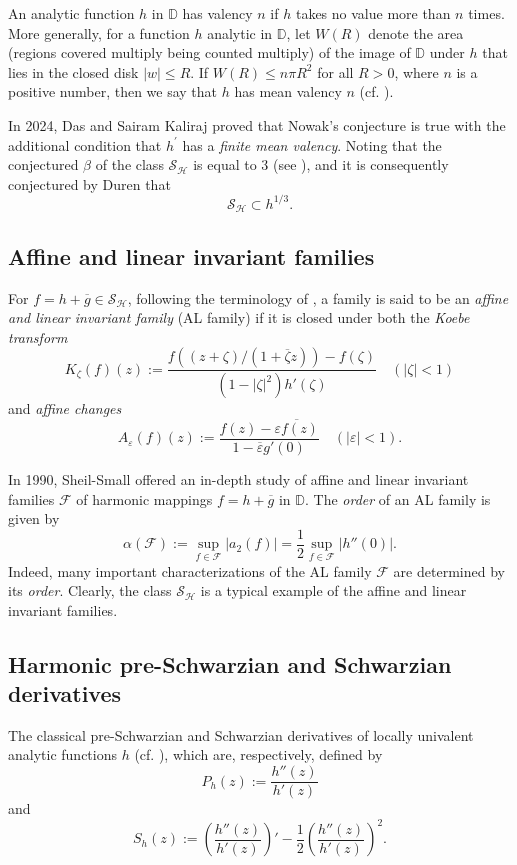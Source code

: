 \documentclass[11pt, reqno]{amsart}
\numberwithin{equation}{section}
\newcommand{\abs}[1]{\left\vert#1\right\vert}
\newcommand{\D}{\mbox{$\mathbb{D}$}}
\begin{document}
An analytic function $h$ in $\D$ has valency $n$ if $h$ takes no value
more than $n$ times. More generally, for a function $h$ analytic in $\D$, let $W(R)$ denote
the area (regions covered multiply being counted multiply) of the image of $\D$ under
$h$ that lies in the closed disk $\abs{w}\leq R$. If $W(R)\leq n\pi R^2$ for all $R>0$, where $n$ is a positive number, then we say that $h$ has mean valency $n$ (cf. \cite{ds}).


In 2024, Das and Sairam Kaliraj \cite[Theorem 1]{ds}
proved that Nowak's conjecture is true with the additional condition that $h^\prime$ has a \textit{finite mean valency}. %
Noting that the conjectured $\beta$ of the class $\mathcal{S}_\mathcal{H}$ is equal to $3$ (see \cite{cs}), and it is consequently conjectured by Duren \cite[p. 152, Sect. 8.5]{d} that $$\mathcal{S}_\mathcal{H}\subset h^{{1}/{3}}.$$%

\subsection{Affine and linear invariant families}
For $f=h+\overline{g}\in\mathcal{S}_\mathcal{H}$, following the terminology of \cite{s}, a family is said to be an \textit{affine
and linear invariant family} ({AL} family) if it is closed under both the \textit{Koebe transform}
$$
K_{\zeta}(f)(z):=\frac{f\left((z+\zeta)/\left(1+\overline{\zeta} z\right)\right)-f(\zeta)}{\left(1-\abs{\zeta}^2\right)h'(\zeta)}
\quad(\abs{\zeta}<1)
$$
and \textit{affine changes}
$$A_{\varepsilon}(f)(z):=\frac{f(z)-\overline{\varepsilon f(z)}}{1-\overline{\varepsilon}g'(0)}
\quad(\abs{\varepsilon}<1).$$

In 1990, Sheil-Small \cite{s} %
offered an in-depth study of affine and linear invariant families $\mathcal{F}$ of
harmonic mappings $f=h+\overline{g}$ in $\D$. The {\it order} of an AL family is given by
$$\alpha(\mathcal{F}):=\sup\limits_
{f\in\mathcal{F}}
\abs{a_2(f)}=\frac{1}{2}
\sup\limits_
{f\in\mathcal{F}}
\abs{h''(0)}.$$
Indeed, many important characterizations of the AL family $\mathcal{F}$ are determined
by its {\it order}. Clearly, the class $\mathcal{S_{\mathcal{H}}}$ is a typical example of the affine and linear invariant families.

\subsection{Harmonic pre-Schwarzian and Schwarzian derivatives}
The classical pre-Schwarzian and Schwarzian derivatives of locally univalent analytic functions $h$ (cf. \cite{du}),
which are, respectively, defined by
$$P_h(z):=\frac{h''(z)}{h'(z)}$$
and
$$S_h(z):=\left(\frac{h''(z)}{h'(z)}\right)'-\frac{1}{2}\left(\frac{h''(z)}{h'(z)}\right)^2.$$
\end{document}
